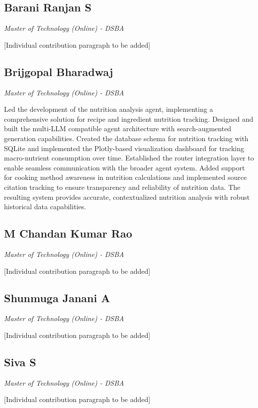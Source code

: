 \documentclass{ecai}
\begin{document}
\subsection*{Barani Ranjan S}
\textit{Master of Technology (Online) - DSBA}

[Individual contribution paragraph to be added]

\subsection*{Brijgopal Bharadwaj}
\textit{Master of Technology (Online) - DSBA}

Led the development of the nutrition analysis agent, implementing a comprehensive solution for recipe and ingredient nutrition tracking. Designed and built the multi-LLM compatible agent architecture with search-augmented generation capabilities. Created the database schema for nutrition tracking with SQLite and implemented the Plotly-based visualization dashboard for tracking macro-nutrient consumption over time. Established the router integration layer to enable seamless communication with the broader agent system. Added support for cooking method awareness in nutrition calculations and implemented source citation tracking to ensure transparency and reliability of nutrition data. The resulting system provides accurate, contextualized nutrition analysis with robust historical data capabilities.

\subsection*{M Chandan Kumar Rao}
\textit{Master of Technology (Online) - DSBA}

[Individual contribution paragraph to be added]

\subsection*{Shunmuga Janani A}
\textit{Master of Technology (Online) - DSBA}

[Individual contribution paragraph to be added]

\subsection*{Siva S}
\textit{Master of Technology (Online) - DSBA}

[Individual contribution paragraph to be added]

\clearpage
\end{document}

